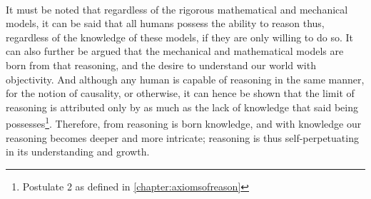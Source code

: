 \paragraph{}It must be noted that regardless of the rigorous mathematical and mechanical models, it can be said that all humans possess the ability to reason thus, regardless of the knowledge of these models, if they are only willing to do so. It can also further be argued that the mechanical and mathematical models are born from that reasoning, and the desire to understand our world with objectivity. And although any human is capable of reasoning in the same manner, for the notion of causality, or otherwise, it can hence be shown that the limit of reasoning is attributed only by as much as the lack of knowledge that said being possesses\footnote{Postulate 2 as defined in \autoref{chapter:axiomsofreason}}. Therefore, from reasoning is born knowledge, and with knowledge our reasoning becomes deeper and more intricate; reasoning is thus self-perpetuating in its understanding and growth.